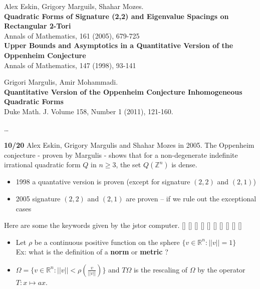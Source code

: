 \documentclass[12pt]{article}
\begin{document}
\begin{thebibliography}{}

\item Alex Eskin, Grigory Marguils, Shahar Mozes. \\
\textbf{Quadratic Forms of Signature (2,2) and Eigenvalue Spacings on Rectangular 2-Tori} \\  Annals of Mathematics, 161 (2005), 679-725 \\ 
\textbf{Upper Bounds and Asymptotics
 in a Quantitative Version of the
 Oppenheim Conjecture} \\  Annals of Mathematics, 147 (1998), 93-141
\item Grigori Margulis, Amir Mohammadi. \\ \textbf{Quantitative Version of the Oppenheim Conjecture Inhomogeneous Quadratic Forms} \\ Duke Math. J.
Volume 158, Number 1 (2011), 121-160. 
\item \dots 

\end{thebibliography} 
\noindent \textbf{10/20} Alex Eskin, Grigory Margulis and Shahar Mozes in 2005.  The Oppenheim conjecture  - proven by Margulis - shows that for a non-degenerate indefinite irrational quadratic form $Q$ in $n \geq 3$, the set $Q(\mathbb{Z}^n)$ is dense.  
\begin{itemize}
\item 1998 a quantative version is proven (except for signature $(2,2)$ and $(2,1)$)
\item 2005 signature $(2,2)$ and $(2,1)$ are proven -- if we rule out the exceptional cases
\end{itemize}
Here are some the keywords given by the jstor computer.  [{\color{blue!50!green!50!black}{rectangles}}] [{\color{blue!50!green!50!black}{signatures}}] [{\color{blue!50!green!50!black}{lattices}}] [{\color{blue!50!green!50!black}{sine function}}] [{\color{blue!50!green!50!black}{eigenvalues}}] [{\color{blue!50!green!50!black}{vectors}}] [{\color{blue!50!green!50!black}{Mathematical theorems}}] [{\color{blue!50!green!50!black}{integers}}] [{\color{blue!50!green!50!black}{Diophantine sets}}] [{\color{blue!50!green!50!black}{coefficients}}]
\begin{itemize}
\item Let $\rho$ be a continuous positive function on the sphere $\{ v \in \mathbb{R}^n : ||v||=1 \}$ \\ 
Ex: what is the definition of a \textbf{norm} or \textbf{metric} ?
\item $\Omega = \{ v\in \mathbb{R}^n : ||v|| < \rho(\frac{v}{||v||})  \}$ and $T\Omega$ is the rescaling of $\Omega$ by the operator $T: x \mapsto ax$.
\end{itemize}
\end{document}
